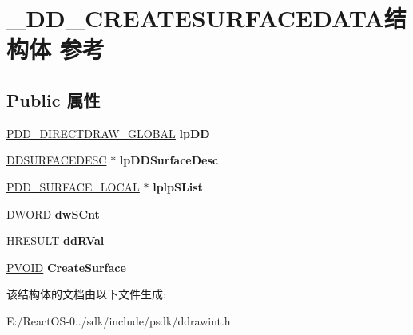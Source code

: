\hypertarget{struct___d_d___c_r_e_a_t_e_s_u_r_f_a_c_e_d_a_t_a}{}\section{\+\_\+\+D\+D\+\_\+\+C\+R\+E\+A\+T\+E\+S\+U\+R\+F\+A\+C\+E\+D\+A\+T\+A结构体 参考}
\label{struct___d_d___c_r_e_a_t_e_s_u_r_f_a_c_e_d_a_t_a}
\subsection*{Public 属性}
\begin{DoxyCompactItemize}
\item 
\mbox{\label{struct___d_d___c_r_e_a_t_e_s_u_r_f_a_c_e_d_a_t_a_a0dcbbfd415c4618922c1ba7336fde017}} 
\hyperlink{struct___d_d___d_i_r_e_c_t_d_r_a_w___g_l_o_b_a_l}{P\+D\+D\+\_\+\+D\+I\+R\+E\+C\+T\+D\+R\+A\+W\+\_\+\+G\+L\+O\+B\+AL} {\bfseries lp\+DD}
\item 
\mbox{\label{struct___d_d___c_r_e_a_t_e_s_u_r_f_a_c_e_d_a_t_a_a2e6eb4373eca0c147d6c04f48c9ad1a9}} 
\hyperlink{interfacevoid}{D\+D\+S\+U\+R\+F\+A\+C\+E\+D\+E\+SC} $\ast$ {\bfseries lp\+D\+D\+Surface\+Desc}
\item 
\mbox{\label{struct___d_d___c_r_e_a_t_e_s_u_r_f_a_c_e_d_a_t_a_a7599c750374cfc3a01b5d397a1feb0db}} 
\hyperlink{struct___d_d___s_u_r_f_a_c_e___l_o_c_a_l}{P\+D\+D\+\_\+\+S\+U\+R\+F\+A\+C\+E\+\_\+\+L\+O\+C\+AL} $\ast$ {\bfseries lplp\+S\+List}
\item 
\mbox{\label{struct___d_d___c_r_e_a_t_e_s_u_r_f_a_c_e_d_a_t_a_a7622d006e04609214c9d44bb118a1fca}} 
D\+W\+O\+RD {\bfseries dw\+S\+Cnt}
\item 
\mbox{\label{struct___d_d___c_r_e_a_t_e_s_u_r_f_a_c_e_d_a_t_a_a85865845606e604fa9ca6b1c0dda6927}} 
H\+R\+E\+S\+U\+LT {\bfseries dd\+R\+Val}
\item 
\mbox{\label{struct___d_d___c_r_e_a_t_e_s_u_r_f_a_c_e_d_a_t_a_ad988e108c4da6cca309f049587121aff}} 
\hyperlink{interfacevoid}{P\+V\+O\+ID} {\bfseries Create\+Surface}
\end{DoxyCompactItemize}


该结构体的文档由以下文件生成\+:\begin{DoxyCompactItemize}
\item 
E\+:/\+React\+O\+S-\/0../sdk/include/psdk/ddrawint.\+h\end{DoxyCompactItemize}

